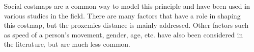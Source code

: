 Social costmaps are a common way to model this principle and have been used in various studies in the field. There are many factors that have a role in shaping this costmap, but the proxemics distance is mainly addressed. Other factors such as speed of a person's movement, gender, age, etc. have also been considered in the literature, but are much less common.%





